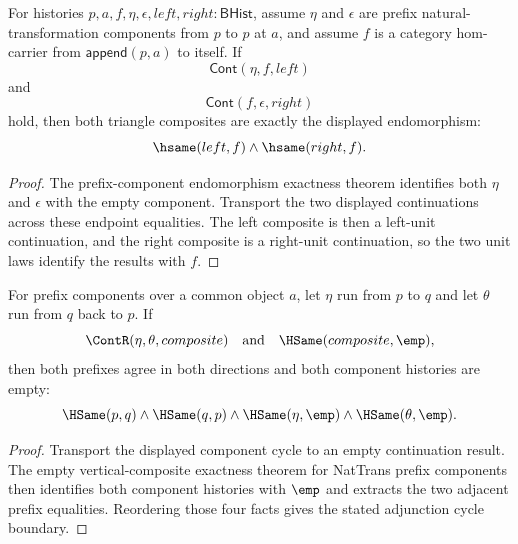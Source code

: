 \begin{theorem}
\label{thm:adjunction-prefix-endomorphism-triangle-identity-exactness}
For histories $p,a,f,\eta,\epsilon,left,right:\mathsf{BHist}$, assume
$\eta$ and $\epsilon$ are prefix natural-transformation components from
$p$ to $p$ at $a$, and assume $f$ is a category hom-carrier from
$\mathsf{append}(p,a)$ to itself. If
$$
\mathsf{Cont}(\eta,f,left)
$$
and
$$
\mathsf{Cont}(f,\epsilon,right)
$$
hold, then both triangle composites are exactly the displayed endomorphism:
$$
\hsame(left,f)\land\hsame(right,f).
$$
\end{theorem}
\begin{proof}
The prefix-component endomorphism exactness theorem identifies both
$\eta$ and $\epsilon$ with the empty component. Transport the two displayed
continuations across these endpoint equalities. The left composite is then a
left-unit continuation, and the right composite is a right-unit continuation,
so the two unit laws identify the results with $f$.
\end{proof}

\begin{theorem}
\label{thm:adjunction-prefix-component-cycle-empty-prefix-same}
For prefix components over a common object $a$, let $\eta$ run from $p$ to
$q$ and let $\theta$ run from $q$ back to $p$. If
$$
\ContR(\eta,\theta,composite)
\quad\text{and}\quad
\HSame(composite,\emp),
$$
then both prefixes agree in both directions and both component histories are
empty:
$$
\HSame(p,q)\land\HSame(q,p)\land\HSame(\eta,\emp)\land\HSame(\theta,\emp).
$$
\end{theorem}
\begin{proof}
Transport the displayed component cycle to an empty continuation result. The
empty vertical-composite exactness theorem for NatTrans prefix components then
identifies both component histories with $\emp$ and extracts the two adjacent
prefix equalities. Reordering those four facts gives the stated adjunction
cycle boundary.
\end{proof}

